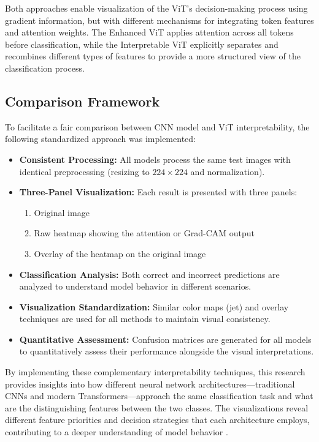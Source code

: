 \documentclass[a4paper,12pt]{report}
\begin{document}
Both approaches enable visualization of the ViT's decision-making process using gradient information, but with different mechanisms for integrating token features and attention weights. The Enhanced ViT applies attention across all tokens before classification, while the Interpretable ViT explicitly separates and recombines different types of features to provide a more structured view of the classification process.

\subsection{Comparison Framework}

To facilitate a fair comparison between CNN model and ViT interpretability, the following standardized approach was implemented:

\begin{itemize}
\item \textbf{Consistent Processing:} All models process the same test images with identical preprocessing (resizing to $224 \times 224$ and normalization).
\item \textbf{Three-Panel Visualization:} Each result is presented with three panels:
\begin{enumerate}
\item Original image
\item Raw heatmap showing the attention or Grad-CAM output
\item Overlay of the heatmap on the original image
\end{enumerate}
\item \textbf{Classification Analysis:} Both correct and incorrect predictions are analyzed to understand model behavior in different scenarios.
\item \textbf{Visualization Standardization:} Similar color maps (jet) and overlay techniques are used for all methods to maintain visual consistency.
\item \textbf{Quantitative Assessment:} Confusion matrices are generated for all models to quantitatively assess their performance alongside the visual interpretations.
\end{itemize}

By implementing these complementary interpretability techniques, this research provides insights into how different neural network architectures—traditional CNNs and modern Transformers—approach the same classification task and what are the distinguishing features between the two classes. The visualizations reveal different feature priorities and decision strategies that each architecture employs, contributing to a deeper understanding of model behavior \cite{dosovitskiy2021imageworth16x16words}.
\end{document}
